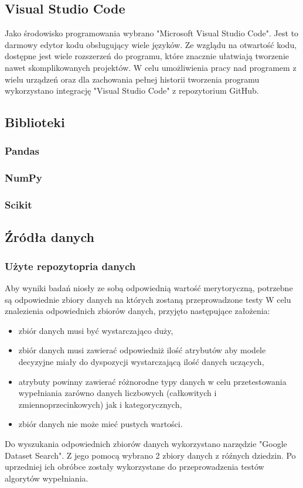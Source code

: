 \documentclass[12pt,twoside]{article}
\begin{document}
\subsection{Visual Studio Code}
Jako środowisko programowania wybrano "Microsoft Visual Studio Code". Jest to darmowy edytor kodu obsługujący wiele języków.
Ze wzglądu na otwartość kodu, dostępne jest wiele rozszerzeń do programu, które znacznie ułatwiają tworzenie nawet skomplikowanych projektów.
W celu umożliwienia pracy nad programem z wielu urządzeń
oraz dla zachowania pełnej historii tworzenia programu wykorzystano integrację "Visual Studio Code" z repozytorium GitHub.
\subsection{Biblioteki}
\subsubsection{Pandas}

\subsubsection{NumPy}
\subsubsection{Scikit}
\subsection{Źródła danych}
\subsubsection{Użyte repozytopria danych}
Aby wyniki badań niosły ze sobą odpowiednią wartość merytoryczną, potrzebne są odpowiednie zbiory danych na których zostaną przeprowadzone testy
 W celu znalezienia odpowiednich zbiorów danych, przyjęto następujące założenia:
\begin{itemize}[label=-,labelsep=0.4cm, leftmargin=1.25cm]
    \item zbiór danych musi być wystarczająco duży,
    \item zbiór danych musi zawierać odpowiedniż ilość atrybutów aby modele decyzyjne miały
    do dyspozycji wystarczającą ilość danych uczących,
    \item atrybuty powinny zawierać różnorodne typy danych w celu przetestowania wypełniania zarówno danych
    liczbowych (całkowitych i zmiennoprzecinkowych) jak i kategorycznych,
    \item zbiór danych nie może mieć pustych wartości.
\end{itemize}
Do wyszukania odpowiednich zbiorów danych wykorzystano narzędzie "Google Dataset Search".
Z jego pomocą wybrano 2 zbiory danych z róźnych dziedzin. Po uprzedniej ich obróbce zostały wykorzystane do przeprowadzenia testów algorytów wypełniania.
\end{document}
